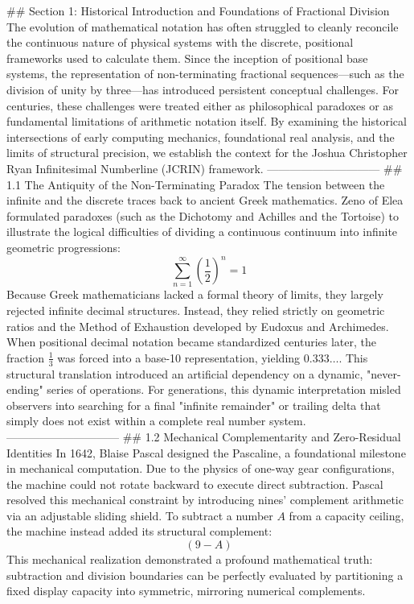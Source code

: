 ## Section 1: Historical Introduction and Foundations of Fractional Division
The evolution of mathematical notation has often struggled to cleanly reconcile the continuous nature of physical systems with the discrete, positional frameworks used to calculate them. Since the inception of positional base systems, the representation of non-terminating fractional sequences—such as the division of unity by three—has introduced persistent conceptual challenges. For centuries, these challenges were treated either as philosophical paradoxes or as fundamental limitations of arithmetic notation itself.
By examining the historical intersections of early computing mechanics, foundational real analysis, and the limits of structural precision, we establish the context for the Joshua Christopher Ryan Infinitesimal Numberline (JCRIN) framework.
------------------------------
## 1.1 The Antiquity of the Non-Terminating Paradox
The tension between the infinite and the discrete traces back to ancient Greek mathematics. Zeno of Elea formulated paradoxes (such as the Dichotomy and Achilles and the Tortoise) to illustrate the logical difficulties of dividing a continuous continuum into infinite geometric progressions:
$$\sum_{n=1}^{\infty} \left(\frac{1}{2}\right)^n = 1$$ 
Because Greek mathematicians lacked a formal theory of limits, they largely rejected infinite decimal structures. Instead, they relied strictly on geometric ratios and the Method of Exhaustion developed by Eudoxus and Archimedes.
When positional decimal notation became standardized centuries later, the fraction $\frac{1}{3}$ was forced into a base-10 representation, yielding $0.333\dots$. This structural translation introduced an artificial dependency on a dynamic, "never-ending" series of operations. For generations, this dynamic interpretation misled observers into searching for a final "infinite remainder" or trailing delta that simply does not exist within a complete real number system.
------------------------------
## 1.2 Mechanical Complementarity and Zero-Residual Identities
In 1642, Blaise Pascal designed the Pascaline, a foundational milestone in mechanical computation. Due to the physics of one-way gear configurations, the machine could not rotate backward to execute direct subtraction. Pascal resolved this mechanical constraint by introducing nines' complement arithmetic via an adjustable sliding shield.
To subtract a number $A$ from a capacity ceiling, the machine instead added its structural complement:
$$(9 - A)$$ 
This mechanical realization demonstrated a profound mathematical truth: subtraction and division boundaries can be perfectly evaluated by partitioning a fixed display capacity into symmetric, mirroring numerical complements.
